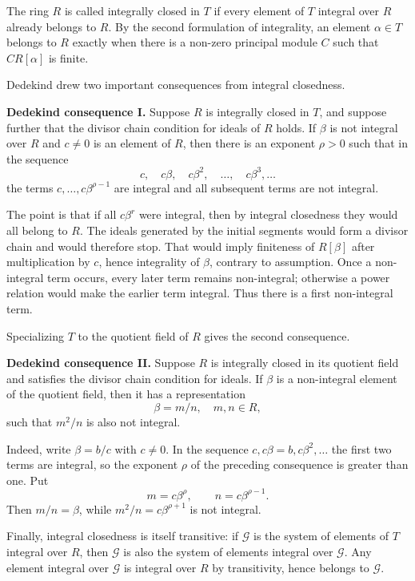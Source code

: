 \documentclass[12pt]{article}
\begin{document}
The ring $R$ is called integrally closed in $T$ if every element of $T$ integral over $R$ already belongs to $R$. By the second formulation of integrality, an element $\alpha\in T$ belongs to $R$ exactly when there is a non-zero principal module $C$ such that $C R[\alpha]$ is finite.

Dedekind drew two important consequences from integral closedness.

\textbf{Dedekind consequence I.} Suppose $R$ is integrally closed in $T$, and suppose further that the divisor chain condition for ideals of $R$ holds. If $\beta$ is not integral over $R$ and $c\neq0$ is an element of $R$, then there is an exponent $\rho>0$ such that in the sequence
\[
  c,
  \quad c\beta,
  \quad c\beta^2,
  \quad \ldots,
  \quad c\beta^3,\ldots
\]
the terms $c,\ldots,c\beta^{\rho-1}$ are integral and all subsequent terms are not integral.

The point is that if all $c\beta^r$ were integral, then by integral closedness they would all belong to $R$. The ideals generated by the initial segments would form a divisor chain and would therefore stop. That would imply finiteness of $R[\beta]$ after multiplication by $c$, hence integrality of $\beta$, contrary to assumption. Once a non-integral term occurs, every later term remains non-integral; otherwise a power relation would make the earlier term integral. Thus there is a first non-integral term.

Specializing $T$ to the quotient field of $R$ gives the second consequence.

\textbf{Dedekind consequence II.} Suppose $R$ is integrally closed in its quotient field and satisfies the divisor chain condition for ideals. If $\beta$ is a non-integral element of the quotient field, then it has a representation
\[
  \beta=m/n,
  \quad m,n\in R,
\]
such that $m^2/n$ is also not integral.

Indeed, write $\beta=b/c$ with $c\neq0$. In the sequence $c,c\beta=b,c\beta^2,\ldots$ the first two terms are integral, so the exponent $\rho$ of the preceding consequence is greater than one. Put
\[
  m=c\beta^\rho,
  \qquad n=c\beta^{\rho-1}.
\]
Then $m/n=\beta$, while $m^2/n=c\beta^{\rho+1}$ is not integral.

Finally, integral closedness is itself transitive: if $\mathcal G$ is the system of elements of $T$ integral over $R$, then $\mathcal G$ is also the system of elements integral over $\mathcal G$. Any element integral over $\mathcal G$ is integral over $R$ by transitivity, hence belongs to $\mathcal G$.
\end{document}
